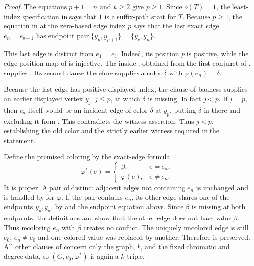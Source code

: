 \begin{proof}
The equations \(p+1=n\) and \(n\geq2\) give \(p\geq1\).  Since
\(\rho(T)=1\), the least-index specification in
 says that \(1\) is a suffix-path start for
\(T\).  Because \(p\geq1\), the equation in
 at the zero-based edge index \(p\) says
that the last exact edge \(e_n=e_{p+1}\) has endpoint pair
\(\{y_p,y_{p+1}\}=\{y_p,y_n\}\).

This last edge is distinct from \(e_1=e_0\).  Indeed, its position \(p\)
is positive, while the edge-position map of  is
injective.  The  inside
, obtained from the first conjunct of
, supplies
.  Its second clause therefore supplies a
color \(\delta\) with \(\varphi(e_n)=\delta\).

Because the last edge has positive displayed index, the
 clause of badness supplies an earlier displayed
vertex \(y_j\), \(j\leq p\), at which \(\delta\) is missing.  In fact
\(j<p\).  If \(j=p\), then \(e_n\) itself would be an incident edge of
color \(\delta\) at \(y_p\), putting \(\delta\) in
 there and excluding it from
.  This contradicts the witness assertion.
Thus \(j<p\), establishing the old color and the strictly earlier
witness required in the statement.

Define the promised coloring by the exact-edge formula
\[
 \varphi^*(e)=
 \begin{cases}
   \beta,&e=e_n,\\
   \varphi(e),&e\ne e_n.
 \end{cases}
\]
It is proper.  A pair of distinct adjacent edges not containing \(e_n\)
is unchanged and is handled by  for
\(\varphi\).  If the pair contains \(e_n\), its other edge shares one of
the endpoints \(y_p,y_n\), by  and the endpoint
equation above.  Since \(\beta\) is missing at both endpoints, the
definitions  and  show
that the other edge does not have value \(\beta\).  Thus recoloring
\(e_n\) with \(\beta\) creates no conflict.  The uniquely uncolored edge
is still \(e_0\): \(e_n\ne e_0\) and one colored value was replaced by
another.  Therefore  is preserved.  All
other clauses of  concern only the graph, \(k\), and
the fixed chromatic and degree data, so \((G,e_0,\varphi^*)\) is again a
\(k\)-triple.


\end{proof}

